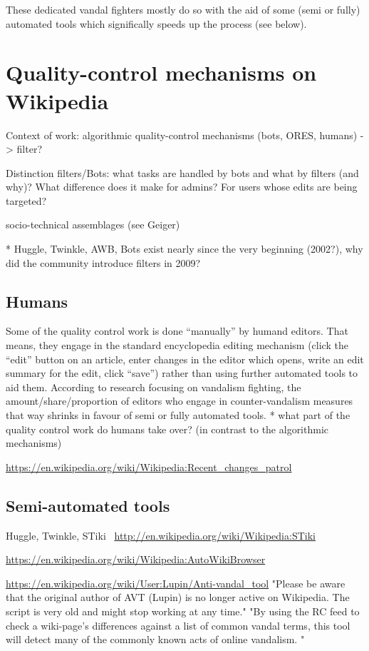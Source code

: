 These dedicated vandal fighters mostly do so with the aid of some (semi or fully) automated tools which significally speeds up the process (see below).

\section{Quality-control mechanisms on Wikipedia}
Context of work: algorithmic quality-control mechanisms (bots, ORES, humans) -> filter?

Distinction filters/Bots: what tasks are handled by bots and what by filters (and why)? What difference does it make for admins? For users whose edits are being targeted?

socio-technical assemblages (see Geiger)

* Huggle, Twinkle, AWB, Bots exist nearly since the very beginning (2002?), why did the community introduce filters in 2009?

\subsection{Humans}

Some of the quality control work is done ``manually'' by humand editors.
That means, they engage in the standard encyclopedia editing mechanism (click the ``edit'' button on an article, enter changes in the editor which opens, write an edit summary for the edit, click ``save'') rather than using further automated tools to aid them.
According to research focusing on vandalism fighting, the amount/share/proportion of editors who engage in counter-vandalism measures that way shrinks in favour of semi or fully automated tools. %
* what part of the quality control work do humans take over? (in contrast to the algorithmic mechanisms)

\url{https://en.wikipedia.org/wiki/Wikipedia:Recent_changes_patrol}

\subsection{Semi-automated tools}

Huggle, Twinkle, STiki~\cite{WestKanLee2010}
\url{http://en.wikipedia.org/wiki/Wikipedia:STiki}

\url{https://en.wikipedia.org/wiki/Wikipedia:AutoWikiBrowser}

\url{https://en.wikipedia.org/wiki/User:Lupin/Anti-vandal_tool}
"Please be aware that the original author of AVT (Lupin) is no longer active on Wikipedia. The script is very old and might stop working at any time."
"By using the RC feed to check a wiki-page's differences against a list of common vandal terms, this tool will detect many of the commonly known acts of online vandalism. "

